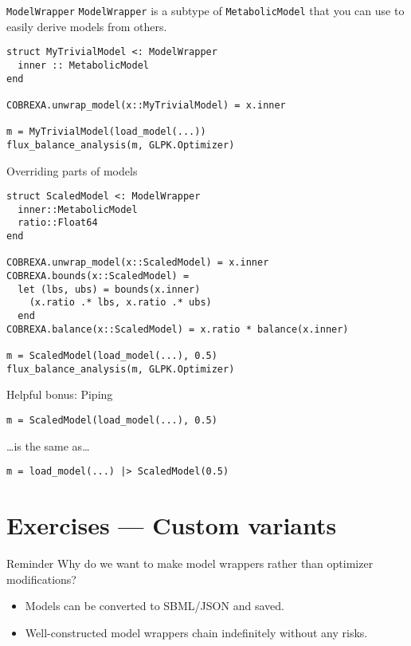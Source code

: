 \documentclass[aspectratio=169]{beamer}
\begin{document}
\begin{frame}[fragile]{\upshape\texttt{ModelWrapper}}
\verb|ModelWrapper| is a subtype of \verb|MetabolicModel| that you can use to
easily derive models from others.

\begin{verbatim}
struct MyTrivialModel <: ModelWrapper
  inner :: MetabolicModel
end

COBREXA.unwrap_model(x::MyTrivialModel) = x.inner

m = MyTrivialModel(load_model(...))
flux_balance_analysis(m, GLPK.Optimizer)
\end{verbatim}
\end{frame}

\begin{frame}[fragile]{Overriding parts of models}
\begin{verbatim}
struct ScaledModel <: ModelWrapper
  inner::MetabolicModel
  ratio::Float64
end

COBREXA.unwrap_model(x::ScaledModel) = x.inner
COBREXA.bounds(x::ScaledModel) =
  let (lbs, ubs) = bounds(x.inner)
    (x.ratio .* lbs, x.ratio .* ubs)
  end
COBREXA.balance(x::ScaledModel) = x.ratio * balance(x.inner)

m = ScaledModel(load_model(...), 0.5)
flux_balance_analysis(m, GLPK.Optimizer)
\end{verbatim}
\end{frame}

\begin{frame}[fragile]{Helpful bonus: Piping}
\begin{verbatim}
m = ScaledModel(load_model(...), 0.5)
\end{verbatim}
\dots is the same as\dots
\begin{verbatim}
m = load_model(...) |> ScaledModel(0.5)
\end{verbatim}
\end{frame}

\section{Exercises --- Custom variants}

\begin{frame}[standout]{Reminder}
Why do we want to make model wrappers rather than optimizer modifications?
\bigskip
\begin{itemize}
\item Models can be converted to SBML/JSON and saved.
\item Well-constructed model wrappers chain indefinitely without any risks.
\end{itemize} 
\end{frame}
\end{document}
